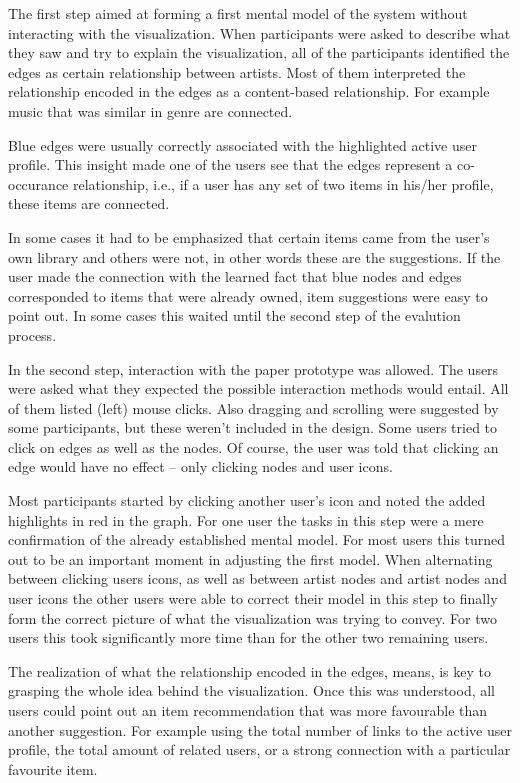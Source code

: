 The first step aimed at forming a first mental model of the system without interacting with the visualization. When participants were asked to describe what they saw and try to explain the visualization, all of the participants identified the edges as certain relationship between artists. Most of them interpreted the relationship encoded in the edges as a content-based relationship. For example music that was similar in genre are connected.

Blue edges were usually correctly associated with the highlighted active user profile. This insight made one of the users see that the edges represent a co-occurance relationship, i.e., if a user has any set of two items in his/her profile, these items are connected.

In some cases it had to be emphasized that certain items came from the user’s own library and others were not, in other words these are the suggestions. If the user made the connection with the learned fact that blue nodes and edges corresponded to items that were already owned, item suggestions were easy to point out. In some cases this waited until the second step of the evalution process.

In the second step, interaction with the paper prototype was allowed. The users were asked what they expected the possible interaction methods would entail. All of them listed (left) mouse clicks. Also dragging and scrolling were suggested by some participants, but these weren’t included in the design. Some users tried to click on edges as well as the nodes. Of course, the user was told that clicking an edge would have no effect – only clicking nodes and user icons.

Most participants started by clicking another user’s icon and noted the added highlights in red in the graph. For one user the tasks in this step were a mere confirmation of the already established mental model. For most users this turned out to be an important moment in adjusting the first model. When alternating between clicking users icons, as well as between artist nodes and artist nodes and user icons the other users were able to correct their model in this step to finally form the correct picture of what the visualization was trying to convey. For two users this took significantly more time than for the other two remaining users.

The realization of what the relationship encoded in the edges, means, is key to grasping the whole idea behind the visualization. Once this was understood, all users could point out an item recommendation that was more favourable than another suggestion. For example using the total number of links to the active user profile, the total amount of related users, or a strong connection with a particular favourite item.


